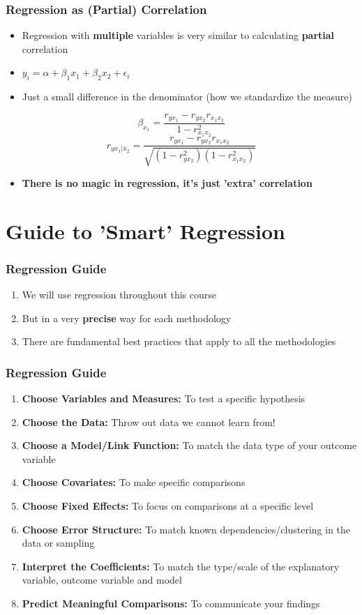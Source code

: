 \documentclass[xcolor=x11names,compress]{beamer}\usepackage[]{graphicx}\usepackage[]{color}
\renewcommand{\(}{\begin{columns}}
\renewcommand{\)}{\end{columns}}
\newcommand{\<}[1]{\begin{column}{#1}}
\renewcommand{\>}{\end{column}}
\begin{document}
\begin{frame}
\frametitle{Regression as (Partial) Correlation}
\begin{itemize}
\item Regression with \textbf{multiple} variables is very similar to calculating \textbf{partial} correlation
\pause
\item $y_i = \alpha + \beta_1 x_1 + \beta_2 x_2 +\epsilon_i$
\pause
\item Just a small difference in the denominator (how we standardize the measure)
\pause
\end{itemize}
$$\beta_{x_1} = \frac{r_{yx_1} - r_{yx_2}r_{x_1x_2}}{1-r^2_{x_1x_2}}$$
$$r_{yx_1|x_2} = \frac{r_{yx_1} - r_{yx_2}r_{x_1x_2}}{\sqrt{(1-r^2_{yx_2})(1-r^2_{x_1x_2})}}$$
\begin{itemize}
\item \textbf{There is no magic in regression, it's just 'extra' correlation}
\end{itemize}
\end{frame}



\section{Guide to 'Smart' Regression}

\begin{frame}
\frametitle{Regression Guide}
\begin{enumerate}
\item We will use regression throughout this course
\pause
\item But in a very \textbf{precise} way for each methodology
\pause
\item There are fundamental best practices that apply to all the methodologies
\end{enumerate}
\end{frame}

\begin{frame}
\frametitle{Regression Guide}
\begin{enumerate}
\item \textbf{Choose Variables and Measures:} To test a specific hypothesis
\pause
\item \textbf{Choose the Data:} Throw out data we cannot learn from!
\pause
\item \textbf{Choose a Model/Link Function:} To match the data type of your outcome variable
\pause
\item \textbf{Choose Covariates:} To make specific comparisons
\pause
\item \textbf{Choose Fixed Effects:} To focus on comparisons at a specific level
\pause
\item \textbf{Choose Error Structure:} To match known dependencies/clustering in the data or sampling
\pause
\item \textbf{Interpret the Coefficients:} To match the type/scale of the explanatory variable, outcome variable and model
\pause
\item \textbf{Predict Meaningful Comparisons:} To communicate your findings
\end{enumerate}
\end{frame}
\end{document}
